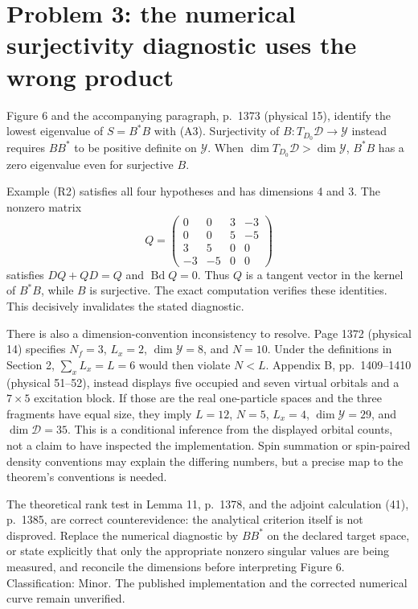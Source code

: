 \documentclass[10pt]{article}
\begin{document}
\section*{Problem 3: the numerical surjectivity diagnostic uses the wrong product}
Figure 6 and the accompanying paragraph, p. 1373 (physical 15), identify the lowest eigenvalue of \(S=B^*B\) with (A3). Surjectivity of \(B:T_{D_0}\mathcal D\to\mathcal Y\) instead requires \(BB^*\) to be positive definite on \(\mathcal Y\). When \(\dim T_{D_0}\mathcal D>\dim\mathcal Y\), \(B^*B\) has a zero eigenvalue even for surjective \(B\).\par
Example (R2) satisfies all four hypotheses and has dimensions 4 and 3. The nonzero matrix \[Q=\begin{pmatrix}
 0&0&3&-3\\0&0&5&-5\\3&5&0&0\\-3&-5&0&0
 \end{pmatrix}\] satisfies \(DQ+QD=Q\) and \(\operatorname{Bd}Q=0\). Thus \(Q\) is a tangent vector in the kernel of \(B^*B\), while \(B\) is surjective. The exact computation verifies these identities. This decisively invalidates the stated diagnostic.\par
There is also a dimension-convention inconsistency to resolve. Page 1372 (physical 14) specifies \(N_f=3\), \(L_x=2\), \(\dim\mathcal Y=8\), and \(N=10\). Under the definitions in Section 2, \(\sum_x L_x=L=6\) would then violate \(N<L\). Appendix B, pp. 1409–1410 (physical 51–52), instead displays five occupied and seven virtual orbitals and a \(7\times5\) excitation block. If those are the real one-particle spaces and the three fragments have equal size, they imply \(L=12\), \(N=5\), \(L_x=4\), \(\dim\mathcal Y=29\), and \(\dim\mathcal D=35\). This is a conditional inference from the displayed orbital counts, not a claim to have inspected the implementation. Spin summation or spin-paired density conventions may explain the differing numbers, but a precise map to the theorem’s conventions is needed.\par
The theoretical rank test in Lemma 11, p. 1378, and the adjoint calculation (41), p. 1385, are correct counterevidence: the analytical criterion itself is not disproved. Replace the numerical diagnostic by \(BB^*\) on the declared target space, or state explicitly that only the appropriate nonzero singular values are being measured, and reconcile the dimensions before interpreting Figure 6. Classification: Minor. The published implementation and the corrected numerical curve remain unverified.\par
\end{document}
